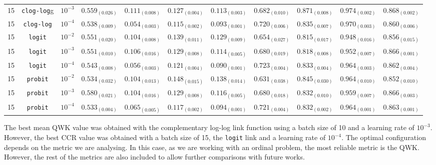 \documentclass[journal]{IEEEtran}
\begin{document}
\begin{table}[!t]
\begin{tabular}{c@{\hskip 0.15cm}c@{\hskip 0.15cm}c@{\hskip 0.15cm}c@{\hskip 0.30cm}c@{\hskip 0.20cm}c@{\hskip 0.20cm}c@{\hskip 0.20cm}c@{\hskip 0.20cm}c@{\hskip 0.20cm}c@{\hskip 0.20cm}c}
			15 & \texttt{clog-log}g & $10^{-3}$ & $0.559_{(0.026)}$ & $\mathit{0.111_{(0.008)}}$ & $0.127_{(0.004)}$ & $0.113_{(0.003)}$ & $0.682_{(0.010)}$ & $0.871_{(0.008)}$ & $\mathit{0.974_{(0.002)}}$ & $\mathbf{0.868_{(0.002)}}$\\
			15 & \texttt{clog-log} & $10^{-4}$ & $0.538_{(0.009)}$ & $0.054_{(0.003)}$ & $\mathbf{0.115_{(0.002)}}$ & $\mathit{0.093_{(0.001)}}$ & $0.720_{(0.006)}$ & $0.835_{(0.007)}$ & $0.970_{(0.003)}$ & $0.860_{(0.006)}$\\
			15 & \texttt{logit} & $10^{-2}$ & $0.551_{(0.020)}$ & $0.104_{(0.008)}$ & $0.139_{(0.011)}$ & $0.129_{(0.009)}$ & $0.654_{(0.027)}$ & $0.815_{(0.017)}$ & $0.948_{(0.016)}$ & $0.856_{(0.015)}$\\
			15 & \texttt{logit} & $10^{-3}$ & $0.551_{(0.010)}$ & $0.106_{(0.016)}$ & $0.129_{(0.008)}$ & $0.114_{(0.005)}$ & $0.680_{(0.019)}$ & $0.818_{(0.008)}$ & $0.952_{(0.007)}$ & $\mathit{0.866_{(0.001)}}$\\
			15 & \texttt{logit} & $10^{-4}$ & $0.543_{(0.008)}$ & $0.056_{(0.003)}$ & $0.121_{(0.004)}$ & $\mathbf{0.090_{(0.001)}}$ & $\mathbf{0.723_{(0.004)}}$ & $0.833_{(0.004)}$ & $0.964_{(0.003)}$ & $0.862_{(0.004)}$\\
			15 & \texttt{probit} & $10^{-2}$ & $0.534_{(0.032)}$ & $0.104_{(0.013)}$ & $0.148_{(0.015)}$ & $0.138_{(0.014)}$ & $0.631_{(0.038)}$ & $0.845_{(0.030)}$ & $0.964_{(0.010)}$ & $0.852_{(0.010)}$\\
			15 & \texttt{probit} & $10^{-3}$ & $\mathit{0.580_{(0.021)}}$ & $0.104_{(0.016)}$ & $0.129_{(0.008)}$ & $0.116_{(0.005)}$ & $0.680_{(0.018)}$ & $0.832_{(0.010)}$ & $0.959_{(0.007)}$ & $0.866_{(0.003)}$\\
			15 & \texttt{probit} & $10^{-4}$ & $0.533_{(0.004)}$ & $0.065_{(0.005)}$ & $0.117_{(0.002)}$ & $0.094_{(0.001)}$ & $\mathit{0.721_{(0.004)}}$ & $0.832_{(0.002)}$ & $0.964_{(0.001)}$ & $0.863_{(0.001)}$\\
			\hline
			\hline
		\end{tabular}
	\end{table}
	
	The best mean QWK value was obtained with the complementary log-log link function using a batch size of 10 and a learning rate of $10^{-3}$. However, the best CCR value was obtained with a batch size of 15, the \texttt{logit} link and a learning rate of $10^{-4}$. The optimal configuration depends on the metric we are analysing. In this case, as we are working with an ordinal problem, the most reliable metric is the QWK. However, the rest of the metrics are also included to allow further comparisons with future works.
	
\end{document}
